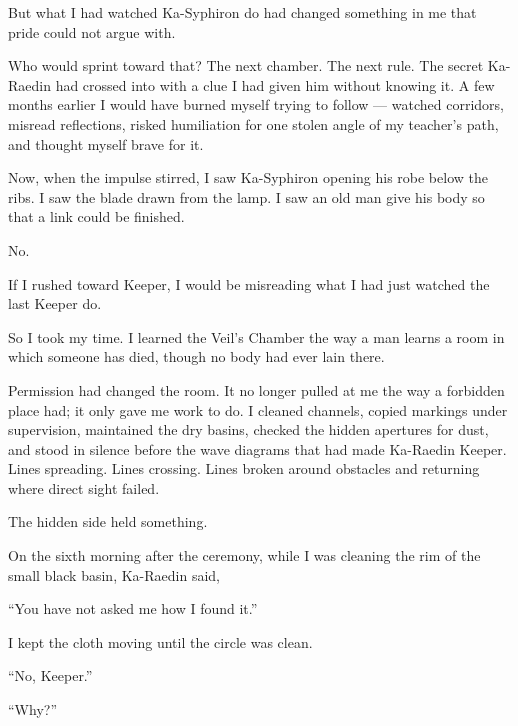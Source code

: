 But what I had watched Ka-Syphiron do had changed something in me that pride could not argue with.\par

Who would sprint toward that? The next chamber. The next rule. The secret Ka-Raedin had crossed into with a clue I had given him without knowing it. A few months earlier I would have burned myself trying to follow --- watched corridors, misread reflections, risked humiliation for one stolen angle of my teacher's path, and thought myself brave for it.\par

Now, when the impulse stirred, I saw Ka-Syphiron opening his robe below the ribs. I saw the blade drawn from the lamp. I saw an old man give his body so that a link could be finished.\par

No.\par

If I rushed toward Keeper, I would be misreading what I had just watched the last Keeper do.\par

So I took my time. I learned the Veil's Chamber the way a man learns a room in which someone has died, though no body had ever lain there.\par

Permission had changed the room. It no longer pulled at me the way a forbidden place had; it only gave me work to do. I cleaned channels, copied markings under supervision, maintained the dry basins, checked the hidden apertures for dust, and stood in silence before the wave diagrams that had made Ka-Raedin Keeper. Lines spreading. Lines crossing. Lines broken around obstacles and returning where direct sight failed.\par

The hidden side held something.\par

On the sixth morning after the ceremony, while I was cleaning the rim of the small black basin, Ka-Raedin said,\par

``You have not asked me how I found it.''\par

I kept the cloth moving until the circle was clean.\par

``No, Keeper.''\par

``Why?''\par

